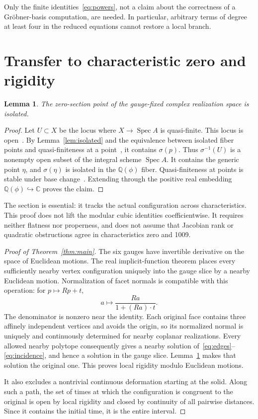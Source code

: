 \documentclass[11pt]{amsart}
\newtheorem{lemma}[theorem]{Lemma}
\theoremstyle{remark}
\newcommand{\Spec}{\operatorname{Spec}}
\begin{document}
Only the finite identities~\eqref{eq:powers}, not a claim about the correctness of a Gr\"obner-basis computation, are needed. In particular, arbitrary terms of degree at least four in the reduced equations cannot restore a local branch.

\section{Transfer to characteristic zero and rigidity}

\begin{lemma}\label{lem:transfer}
The zero-section point of the gauge-fixed complex realization space is isolated.
\end{lemma}
\begin{proof}
Let $U\subset X$ be the locus where $X\to\Spec A$ is quasi-finite. This locus is open~\cite[Tag 01TI]{Stacks}. By Lemma~\ref{lem:isolated} and the equivalence between isolated fiber points and quasi-finiteness at a point~\cite[Tag 01TH]{Stacks}, it contains $\sigma(p)$. Thus $\sigma^{-1}(U)$ is a nonempty open subset of the integral scheme $\Spec A$. It contains the generic point $\eta$, and $\sigma(\eta)$ is isolated in the $\mathbb Q(\phi)$ fiber. Quasi-finiteness at points is stable under base change~\cite[Tag 01TM]{Stacks}. Extending through the positive real embedding $\mathbb Q(\phi)\hookrightarrow\mathbb C$ proves the claim.
\end{proof}

The section is essential: it tracks the actual configuration across characteristics. This proof does not lift the modular cubic identities coefficientwise. It requires neither flatness nor properness, and does not assume that Jacobian rank or quadratic obstructions agree in characteristics zero and 1009.

\begin{proof}[Proof of Theorem~\ref{thm:main}]
The six gauges have invertible derivative on the space of Euclidean motions. The real implicit-function theorem places every sufficiently nearby vertex configuration uniquely into the gauge slice by a nearby Euclidean motion. Normalization of facet normals is compatible with this operation: for $p\mapsto Rp+t$,
\[
 a\mapsto\frac{Ra}{1+(Ra)\cdot t}.
\]
The denominator is nonzero near the identity. Each original face contains three affinely independent vertices and avoids the origin, so its normalized normal is uniquely and continuously determined for nearby coplanar realizations. Every allowed nearby polytope consequently gives a nearby solution of~\eqref{eq:edges}--\eqref{eq:incidence}, and hence a solution in the gauge slice. Lemma~\ref{lem:transfer} makes that solution the original one. This proves local rigidity modulo Euclidean motions.

It also excludes a nontrivial continuous deformation starting at the solid. Along such a path, the set of times at which the configuration is congruent to the original is open by local rigidity and closed by continuity of all pairwise distances. Since it contains the initial time, it is the entire interval.
\end{proof}
\end{document}
